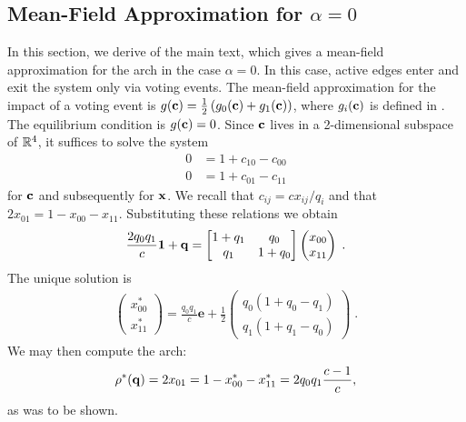 \documentclass[review, onefignum, onetabnum]{siamart171218}
\begin{document}
    \subsection{Mean-Field Approximation for $\alpha = 0$} \label{sec:SI_alpha_0}
        In this section, we derive  of the main text, which gives a mean-field approximation for the arch in the case $\alpha = 0$. 
        In this case, active edges enter and exit the system only via voting events. 
        The mean-field approximation for the impact of a voting event is $g(\mathbf{c}) = \frac{1}{2}\left(g_0(\mathbf{c}) + g_1(\mathbf{c})\right)$, where $g_i(\mathbf{c})$ is defined in . 
        The equilibrium condition is $g(\mathbf{c}) = 0$. 
        Since $\mathbf{c}$ lives in a 2-dimensional subspace of $\mathbb{R}^4$, it suffices to solve the system
        \begin{align*}
        	0 &=  1 + c_{10} - c_{00} \\ 
        	0 &=  1 + c_{01} - c_{11} 
        \end{align*}
        for $\mathbf{c}$ and subsequently for $\mathbf{x}$.  
        We recall that $c_{ij} = c{x_{ij}}/{q_i}$ and that $2x_{01} = 1 - x_{00} - x_{11}$. 
        Substituting these relations we obtain
        \begin{align*}
        \frac{2q_0q_1}{c}\mathbf{1} + \mathbf{q} = \left[\begin{matrix} 1 + q_1 & q_0 \\ q_1 & 1 + q_0 \end{matrix}\right]\left(\begin{matrix}x_{00} \\ x_{11}\end{matrix}\right)\;.
        \end{align*}
        The unique solution is 
        \begin{align*}
        \left(\begin{matrix}x^*_{00} \\ x^*_{11}\end{matrix}\right) = \frac{q_0 q_1}{c} \mathbf{e} + \frac{1}{2}\left(\begin{matrix} q_0(1 + q_0 - q_1) \\ q_1(1 + q_1 - q_0) \end{matrix}\right)\;.
        \end{align*}
        We may then compute the arch: 
        \begin{align*}
        \rho^*(\mathbf{q}) = 2x_{01} 
             = 1 - x^*_{00} - x^*_{11} 
             = 2q_0 q_1 \frac{c-1}{c},
        \end{align*}
        as was to be shown. 
\end{document}

